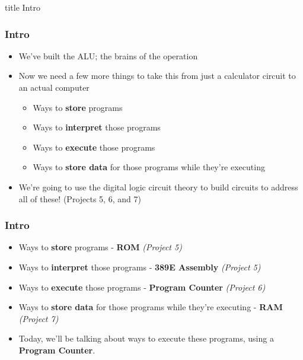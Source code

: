 \documentclass{beamer}
\begin{document}
    	\begin{frame}
                \vfill
                \centering
                \begin{beamercolorbox}[sep=8pt,center,shadow=true,rounded=true]{title}
                    Intro\par%
                \end{beamercolorbox}
                \vfill
             \end{frame}
    
    		\begin{frame}
    			\frametitle{Intro}
    			\begin{itemize}
    				\item We've built the ALU; the brains of the operation
    				\item Now we need a few more things to take this from just a calculator circuit to an actual computer
    				\begin{itemize}
    					\item Ways to \textbf{store} programs
    					\item Ways to \textbf{interpret} those programs
    					\item Ways to \textbf{execute} those programs
    					\item Ways to \textbf{store data} for those programs while they're executing
    				\end{itemize}
    				\item We're going to use the digital logic circuit theory to build circuits to address all of these! (Projects 5, 6, and 7)
    			\end{itemize}
    		\end{frame}
    		
    		\begin{frame}
    			\frametitle{Intro}
    			
    				\begin{itemize}
    					\item Ways to \textbf{store} programs - \textbf{ROM} \textit{(Project 5)}
    					\item Ways to \textbf{interpret} those programs - \textbf{389E Assembly} \textit{(Project 5)}
    					\item Ways to \textbf{execute} those programs - \textbf{Program Counter} \textit{(Project 6)}
    					\item Ways to \textbf{store data} for those programs while they're executing - \textbf{RAM} \textit{(Project 7)}
    					\item Today, we'll be talking about ways to execute these programs, using a \textbf{Program Counter}.
    				\end{itemize}
    				
    			
    		\end{frame}
    		
\end{document}
